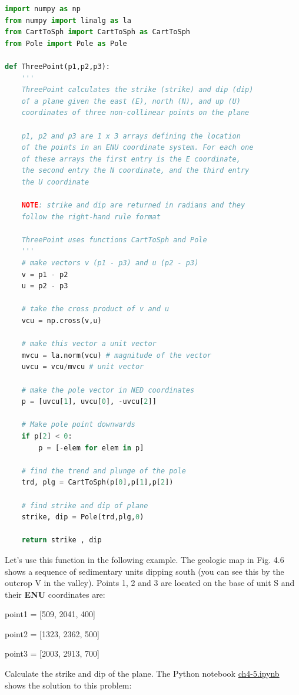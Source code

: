 \documentclass[a4paper , 12pt]{book}
\begin{document}
\begin{lstlisting}[language=Python, frame=single]
import numpy as np
from numpy import linalg as la
from CartToSph import CartToSph as CartToSph
from Pole import Pole as Pole

def ThreePoint(p1,p2,p3):
    '''
    ThreePoint calculates the strike (strike) and dip (dip) 
    of a plane given the east (E), north (N), and up (U) 
    coordinates of three non-collinear points on the plane
    
    p1, p2 and p3 are 1 x 3 arrays defining the location 
    of the points in an ENU coordinate system. For each one 
    of these arrays the first entry is the E coordinate, 
    the second entry the N coordinate, and the third entry 
    the U coordinate

    NOTE: strike and dip are returned in radians and they 
    follow the right-hand rule format

    ThreePoint uses functions CartToSph and Pole
    '''
    # make vectors v (p1 - p3) and u (p2 - p3)
    v = p1 - p2
    u = p2 - p3
    
    # take the cross product of v and u
    vcu = np.cross(v,u)
    
    # make this vector a unit vector
    mvcu = la.norm(vcu) # magnitude of the vector
    uvcu = vcu/mvcu # unit vector
    
    # make the pole vector in NED coordinates
    p = [uvcu[1], uvcu[0], -uvcu[2]]

    # Make pole point downwards
    if p[2] < 0:
        p = [-elem for elem in p]
        
    # find the trend and plunge of the pole
    trd, plg = CartToSph(p[0],p[1],p[2])
    
    # find strike and dip of plane
    strike, dip = Pole(trd,plg,0)
    
    return strike , dip
\end{lstlisting}

Let's use this function in the following example. The geologic map in Fig. 4.6 shows a sequence of sedimentary units dipping south (you can see this by the outcrop V in the valley). Points 1, 2 and 3 are located on the base of unit S and their \textbf{ENU} coordinates are: 

point1 = [509, 2041, 400]

point2 = [1323, 2362, 500]

point3 = [2003, 2913, 700] 

Calculate the strike and dip of the plane. The Python notebook \href{http://github.com}{ch4-5.ipynb} shows the solution to this problem:\\ 
\end{document}

